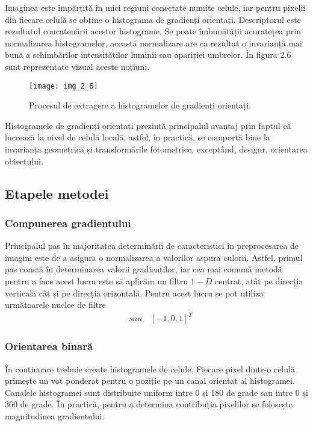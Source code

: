 Imaginea este împărțită în mici regiuni conectate numite celule, iar pentru pixelii din fiecare celulă se obține o histograma de gradienți orientați. Descriptorul este rezultatul concatenării acestor histograme. Se poate îmbunătății acuratețea prin normalizarea histogramelor, această normalizare are ca rezultat o invarianță mai bună a schimbărilor intensităților luminii sau apariției umbrelor. În figura 2.6 sunt reprezentate vizual aceste noțiuni.
\begin{figure}[!h]
	\centering
	\texttt{[image: img\_2\_6]}
	\caption{Procesul de extragere a histogramelor de gradienți orientați.}
\end{figure}

Histogramele de gradienți orientați prezintă principalul avantaj prin faptul că lucrează la nivel de celulă locală, astfel, în practică, se comportă bine la invarianța geometrică și transformările fotometrice, exceptând, desigur, orientarea obiectului.

\subsection{Etapele metodei}

\subsubsection {Compunerea gradientului}

Principalul pas în majoritatea determinării de caracteristici în preprocesarea de imagini este de a asigura o normalizarea a valorilor aspura culorii. Astfel, primul pas constă în determinarea valorii gradienților, iar cea mai comună metodă pentru a face acest lucru este să aplicăm un filtru $1-D$ centrat, atât pe direcția verticală cât și pe direcția orizontală. Pentru acest lucru se pot utiliza următoarele nuclee de filtre
\begin{align}	
	[-1, 0, 1]  \quad sau  \quad  [-1, 0, 1]^T
\end{align}

\subsubsection {Orientarea binară}

În continuare trebuie create histogramele de celule. Fiecare pixel dintr-o celulă primește un vot ponderat pentru o poziție pe un canal orientat al histogramei. Canalele histogramei sunt distribuite uniform intre 0 și 180 de grade sau intre 0 și 360 de grade. În practică, pentru a determina contribuția pixelilor se folosește magnitudinea gradientului.

